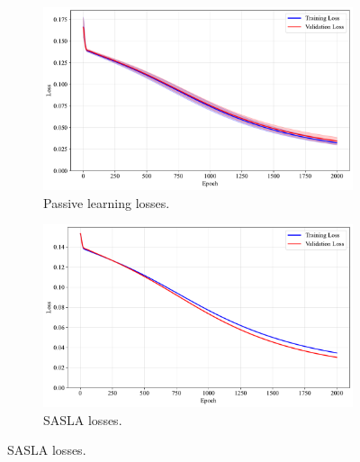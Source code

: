 \documentclass[10pt, conference]{IEEEtran}
\begin{document}
\begin{figure}[!t]
	\centering
	\caption{Losses for training of frameworks with the wine dataset.}
	\label{fig:wine-loss}
	\begin{subfigure}{\linewidth}
		\centering
		\includegraphics[width=\linewidth]{../results/wine/losses.pdf}
		\caption{Passive learning losses.}
		\label{fig:losses_wine}
	\end{subfigure}
	
	\vspace{0.1em}
	
	\begin{subfigure}{\linewidth}
		\centering
		\includegraphics[width=\linewidth]{../results/wine/os_losses.pdf}
		\caption{SASLA losses.}
		\label{fig:os_losses_wine}
	\end{subfigure}
	
	\vspace{0.1em}
	

\end{figure}
\end{document}
